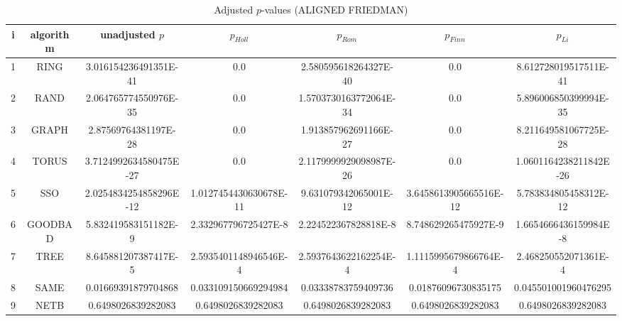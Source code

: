 \documentclass[a4paper,10pt]{article}
\begin{document}
\begin{landscape}
\begin{table}[!htp]
\centering\scriptsize
\caption{Adjusted $p$-values (ALIGNED FRIEDMAN)}
\begin{tabular}{ccccccc}
i&algorithm&unadjusted $p$&$p_{Holl}$&$p_{Rom}$&$p_{Finn}$&$p_{Li}$\\
\hline
1& RING&3.016154236491351E-41&0.0&2.580595618264327E-40&0.0&8.612728019517511E-41\\
2& RAND&2.064765774550976E-35&0.0&1.5703730163772064E-34&0.0&5.896006850399994E-35\\
3& GRAPH&2.87569764381197E-28&0.0&1.913857962691166E-27&0.0&8.211649581067725E-28\\
4& TORUS&3.7124992634580475E-27&0.0&2.1179999929098987E-26&0.0&1.0601164238211842E-26\\
5& SSO&2.0254834254858296E-12&1.0127454430630678E-11&9.631079342065001E-12&3.6458613905665516E-12&5.783834805458312E-12\\
6& GOODBAD&5.832419583151182E-9&2.332967796725427E-8&2.224522367828818E-8&8.748629265475927E-9&1.6654666436159984E-8\\
7& TREE&8.645881207387417E-5&2.5935401148946546E-4&2.5937643622162254E-4&1.1115995679866764E-4&2.468250552071361E-4\\
8& SAME&0.01669391879704868&0.033109150669294984&0.03338783759409736&0.01876096730835175&0.045501001960476295\\
9& NETB&0.6498026839282083&0.6498026839282083&0.6498026839282083&0.6498026839282083&0.6498026839282083\\
\hline
\end{tabular}
\end{table}


\newpage


\end{landscape}
\end{document}
